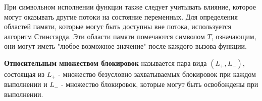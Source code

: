При символьном исполнении функции также следует учитывать влияние, которое могут оказывать другие потоки на состояние переменных. Для определения областей памяти, которые могут быть доступны вне потока, используется алгоритм Стинсгарда. Эти области памяти помечаются символом $T$, означающим, они могут иметь "любое возможное значение" после каждого вызова функции.

\textbf{Относительным множеством блокировок} называется пара вида $(L_{+}, L_{-})$, состоящая из $L_{+}$ - множество безусловно захватываемых блокировок при каждом выполнении и $L_{-}$ - множество блокировок, которые могут быть освобождены при выполнении.


